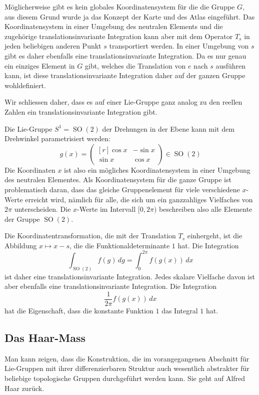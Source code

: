 Möglicherweise gibt es kein globales Koordinatensystem für die 
die Gruppe $G$, aus diesem Grund wurde ja das Konzept der Karte
und des Atlas eingeführt.
Das Koordinatensystem in einer Umgebung des neutralen Elements und
die zugehörige translationsinvariante Integration kann aber mit
dem Operator $T_s$ in jeden beliebigen anderen Punkt $s$ transportiert
werden.
In einer Umgebung von $s$ gibt es daher ebenfalls eine
translationsinvariante Integration.
Da es nur genau ein einziges Element in $G$ gibt, welches die Translation
von $e$ nach $s$ ausführen kann, ist diese translationsinvariante 
Integration daher auf der ganzen Gruppe wohldefiniert.

Wir schliessen daher, dass es auf einer Lie-Gruppe ganz analog 
zu den reellen Zahlen ein translationsinvariante Integration
gibt.

\begin{beispiel}
Die Lie-Gruppe $S^1 = \operatorname{SO}(2)$ der Drehungen in der Ebene
kann mit dem Drehwinkel parametrisiert werden:
\[
g(x)
=
\begin{pmatrix*}[r]
\cos x&-\sin x\\
\sin x& \cos x
\end{pmatrix*}
\in
\operatorname{SO}(2)
\]
Die Koordinaten $x$ ist also ein mögliches Koordinatensystem in einer
Umgebung des neutralen Elementes.
Als Koordinatensystem für die ganze Gruppe ist problematisch daran,
dass das gleiche Gruppenelement für viele verschiedene $x$-Werte
erreicht wird, nämlich für alle, die sich um ein ganzzahliges
Vielfaches von $2\pi$ unterscheiden.
Die $x$-Werte im Intervall $[0,2\pi)$ beschreiben also alle Elemente
der Gruppe $\operatorname{SO}(2)$. 

Die Koordinatentransformation, die mit der Translation $T_s$ einhergeht,
ist die Abbildung $x\mapsto x-s$, die die Funktionaldeterminante $1$
hat.
Die Integration
\[
\int_{\operatorname{SO}(2)} f(g) \,dg
=
\int_0^{2\pi} f(g(x))\,dx
\]
ist daher eine translationsinvariante Integration.
Jedes skalare Vielfache davon ist aber ebenfalls eine translationsinvariante
Integration.
Die Integration
\[
\frac{1}{2\pi} f(g(x))\,dx
\]
hat die Eigenschaft, dass die konstante Funktion $1$ das Integral $1$
hat.
\end{beispiel}

%
%
\subsection{Das Haar-Mass
\label{buch:haar:subsection:haar}}
Man kann zeigen, dass die Konstruktion, die im vorangegangenen Abschnitt
für Lie-Gruppen mit ihrer differenzierbaren Struktur auch wesentlich
abstrakter für beliebige topologische Gruppen durchgeführt werden kann.
Sie geht auf Alfred Haar zurück.

